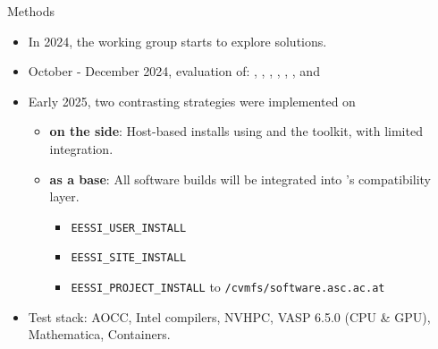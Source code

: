\documentclass[final]{beamer}
\begin{document}
\begin{frame}[t]
\begin{columns}[t]
\begin{column}{0.48\textwidth}
    \begin{block}{Methods}
        \begin{itemize}
            \item In 2024, the \sam{} working group starts to explore solutions.
            \item October - December 2024, evaluation of: \spack{}, \guix{}, \nix{}, \easybuild{}, \eessi{}, \lmod{}, and 
          \item Early 2025, two contrasting strategies were implemented on \musica{}
          \begin{itemize}
              \item \eessi{} \textbf{on the side}: Host-based installs using
                  \easybuild{} and the \sse{} toolkit, with limited \eessi{} integration.
              \item \eessi{} \textbf{as a base}: All software builds will be
                  integrated into \eessi{}'s compatibility layer.
                \begin{itemize}
                  \item \texttt{EESSI\_USER\_INSTALL}
                  \item \texttt{EESSI\_SITE\_INSTALL}
                  \item \texttt{EESSI\_PROJECT\_INSTALL} to \texttt{/cvmfs/software.asc.ac.at}
                \end{itemize}
          \end{itemize}
          \item Test stack: AOCC, Intel compilers, NVHPC, VASP 6.5.0 (CPU \& GPU), Mathematica, Containers.

        \end{itemize}
    \end{block}
    \vfill


\end{column}
\end{columns}
\end{frame}
\end{document}
